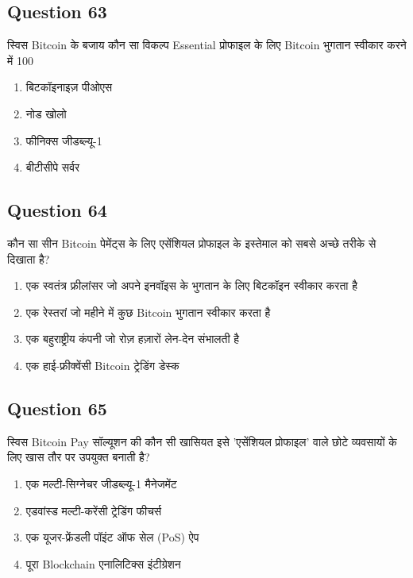 \documentclass[12pt,a4paper]{article}
\begin{document}
\bigskip


\subsection*{Question 63}
स्विस Bitcoin के बजाय कौन सा विकल्प Essential प्रोफाइल के लिए Bitcoin भुगतान स्वीकार करने में 100%

\begin{enumerate}[label=\Alph*., leftmargin=*]
\item बिटकॉइनाइज़ पीओएस
\item नोड खोलो
\item फीनिक्स जीडब्ल्यू-1
\item बीटीसीपे सर्वर
\end{enumerate}

\bigskip


\subsection*{Question 64}
कौन सा सीन Bitcoin पेमेंट्स के लिए एसेंशियल प्रोफाइल के इस्तेमाल को सबसे अच्छे तरीके से दिखाता है?

\begin{enumerate}[label=\Alph*., leftmargin=*]
\item एक स्वतंत्र फ्रीलांसर जो अपने इनवॉइस के भुगतान के लिए बिटकॉइन स्वीकार करता है
\item एक रेस्तरां जो महीने में कुछ Bitcoin भुगतान स्वीकार करता है
\item एक बहुराष्ट्रीय कंपनी जो रोज़ हज़ारों लेन-देन संभालती है
\item एक हाई-फ्रीक्वेंसी Bitcoin ट्रेडिंग डेस्क
\end{enumerate}

\bigskip


\subsection*{Question 65}
स्विस Bitcoin Pay सॉल्यूशन की कौन सी खासियत इसे 'एसेंशियल प्रोफाइल' वाले छोटे व्यवसायों के लिए खास तौर पर उपयुक्त बनाती है?

\begin{enumerate}[label=\Alph*., leftmargin=*]
\item एक मल्टी-सिग्नेचर जीडब्ल्यू-1 मैनेजमेंट
\item एडवांस्ड मल्टी-करेंसी ट्रेडिंग फीचर्स
\item एक यूजर-फ्रेंडली पॉइंट ऑफ सेल (PoS) ऐप
\item पूरा Blockchain एनालिटिक्स इंटीग्रेशन
\end{enumerate}
\end{document}
